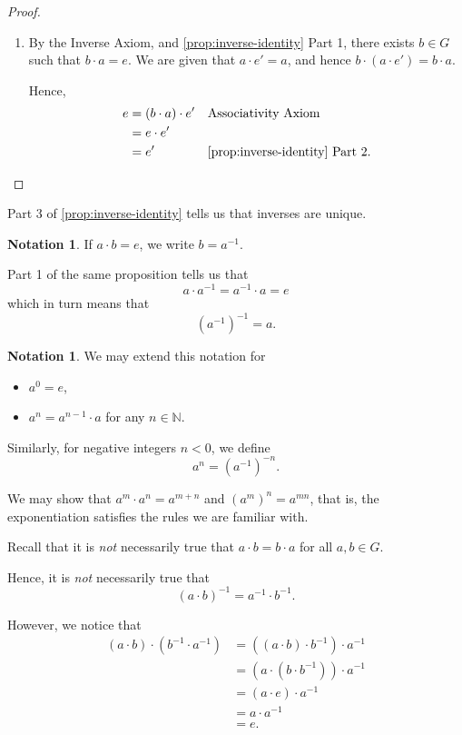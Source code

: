 \documentclass{article}
\theoremstyle{definition}
\newtheorem{notation}[theorem]{Notation}
\theoremstyle{remark}
\newcommand{\pqty}[1]{\left(#1\right)}
\newcommand{\inverse}{^{-1}}
\newcommand{\NN}{\mathbb{N}}
\begin{document}
\begin{proof}
\begin{enumerate}
        \item By the Inverse Axiom, and \autoref{prop:inverse-identity} Part 1, there exists \(b \in G\) such that \(b \cdot a = e\). We are given that \(a \cdot e' = a\), and hence \(b \cdot \pqty{a \cdot e'} = b \cdot a\).

        Hence,
        \begin{align*}
            e &= \pqty{b \cdot a} \cdot e' && \text{Associativity Axiom} \\
            &= e \cdot e' \\
            &= e' && \text{\autoref{prop:inverse-identity} Part 2}.
        \end{align*}
    \end{enumerate}    
\end{proof}

Part 3 of \autoref{prop:inverse-identity} tells us that inverses are unique.

\begin{notation}
    If \(a \cdot b = e\), we write \(b = a \inverse\).
\end{notation}

Part 1 of the same proposition tells us that
\[
    a \cdot a \inverse = a \inverse \cdot a = e
\]
which in turn means that
\[
    \pqty{a \inverse} \inverse = a.
\]

\begin{notation}
    We may extend this notation for
    \begin{itemize}
        \item \(a^0 = e\),
        \item \(a^n = a^{n - 1} \cdot a\) for any \(n \in \NN\).
    \end{itemize}

    Similarly, for negative integers \(n < 0\), we define
    \[
        a^n = \pqty{a \inverse}^{-n}.
    \]
\end{notation}

We may show that \(a^m \cdot a^n = a^{m + n}\) and \(\pqty{a^m}^n = a^{mn}\), that is, the exponentiation satisfies the rules we are familiar with.

Recall that it is \emph{not} necessarily true that \(a \cdot b = b \cdot a\) for all \(a, b \in G\).

Hence, it is \emph{not} necessarily true that
\[
    \pqty{a \cdot b}\inverse = a \inverse \cdot b \inverse.
\]

However, we notice that
\begin{align*}
    \pqty{a \cdot b} \cdot \pqty{b \inverse \cdot a \inverse} &= \pqty{\pqty{a \cdot b} \cdot b\inverse} \cdot a\inverse \\
    &= \pqty{a \cdot \pqty{b \cdot b\inverse}} \cdot a\inverse \\
    &= \pqty{a \cdot e} \cdot a\inverse \\
    &= a \cdot a\inverse \\
    &= e.
\end{align*}
\end{document}

